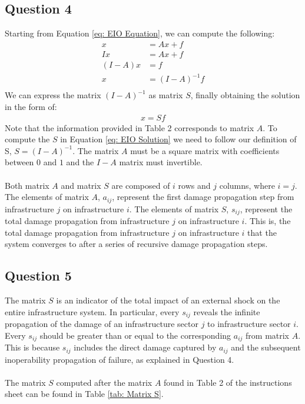 \documentclass[11pt,a4paper]{article}
\begin{document}
\subsection*{Question 4}
Starting from Equation \ref{eq: EIO Equation}, we can compute the following:
\begin{align*}
	x &= Ax + f \\
	Ix &= Ax + f \\
	(I-A)x &= f \\
	x &= (I-A)^{-1}f \\
\end{align*}
We can express the matrix $(I-A)^{-1}$ as matrix $S$, finally obtaining the solution in the form of:
\begin{align} \label{eq: EIO Solution}
	x = Sf
\end{align}
Note that the information provided in Table 2 corresponds to matrix $A$. To compute the $S$ in Equation \ref{eq: EIO Solution} we need to follow our definition of S, $S = (I-A)^{-1}$. The matrix $A$ must be a square matrix with coefficients between $0$ and $1$ and the $I-A$ matrix must invertible. \\
\\
Both matrix $A$ and matrix $S$ are composed of $i$ rows and $j$ columns, where $i=j$. The elements of matrix $A$, $a_{ij}$, represent the first damage propagation step from infrastructure $j$ on infrastructure $i$. The elements of matrix $S$, $s_{ij}$, represent the total damage propagation from infrastructure $j$ on infrastructure $i$. This is, the total damage propagation from infrastructure $j$ on infrastructure $i$ that the system converges to after a series of recursive damage propagation steps.

\subsection*{Question 5}
The matrix $S$ is an indicator of the total impact of an external shock on the entire infrastructure system. In particular, every $s_{ij}$ reveals the infinite propagation of the damage of an infrastructure sector $j$ to infrastructure sector $i$. Every $s_{ij}$ should be greater than or equal to the corresponding $a_{ij}$ from matrix $A$. This is because $s_{ij}$ includes the direct damage captured by $a_{ij}$ and the subsequent inoperability propagation of failure, as explained in Question 4. \\
\\
The matrix $S$ computed after the matrix $A$ found in Table 2 of the instructions sheet can be found in Table \ref{tab: Matrix S}.
\end{document}
